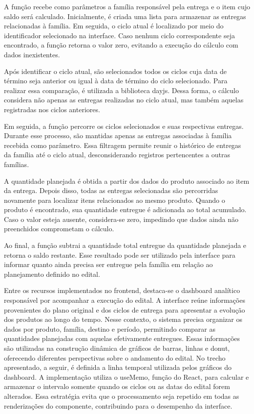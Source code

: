 A função recebe como parâmetros a família responsável pela entrega e o item cujo saldo será calculado. Inicialmente, é criada uma lista para armazenar as entregas relacionadas à família. Em seguida, o ciclo atual é localizado por meio do identificador selecionado na interface. Caso nenhum ciclo correspondente seja encontrado, a função retorna o valor zero, evitando a execução do cálculo com dados inexistentes.

Após identificar o ciclo atual, são selecionados todos os ciclos cuja data de término seja anterior ou igual à data de término do ciclo selecionado. Para realizar essa comparação, é utilizada a biblioteca dayjs. Dessa forma, o cálculo considera não apenas as entregas realizadas no ciclo atual, mas também aquelas registradas nos ciclos anteriores.

Em seguida, a função percorre os ciclos selecionados e suas respectivas entregas. Durante esse processo, são mantidas apenas as entregas associadas à família recebida como parâmetro. Essa filtragem permite reunir o histórico de entregas da família até o ciclo atual, desconsiderando registros pertencentes a outras famílias.

A quantidade planejada é obtida a partir dos dados do produto associado ao item da entrega. Depois disso, todas as entregas selecionadas são percorridas novamente para localizar itens relacionados ao mesmo produto. Quando o produto é encontrado, sua quantidade entregue é adicionada ao total acumulado. Caso o valor esteja ausente, considera-se zero, impedindo que dados ainda não preenchidos comprometam o cálculo.

Ao final, a função subtrai a quantidade total entregue da quantidade planejada e retorna o saldo restante. Esse resultado pode ser utilizado pela interface para informar quanto ainda precisa ser entregue pela família em relação ao planejamento definido no edital.

Entre os recursos implementados no frontend, destaca-se o dashboard analítico responsável por acompanhar a execução do edital. A interface reúne informações provenientes do plano original e dos ciclos de entrega para apresentar a evolução dos produtos ao longo do tempo. Nesse contexto, o sistema precisa organizar os dados por produto, família, destino e período, permitindo comparar as quantidades planejadas com aquelas efetivamente entregues. Essas informações são utilizadas na construção dinâmica de gráficos de barras, linhas e donut, oferecendo diferentes perspectivas sobre o andamento do edital. No trecho apresentado, a seguir, é definida a linha temporal utilizada pelos gráficos do dashboard. A implementação utiliza o useMemo, função do React,  para calcular e armazenar o intervalo somente quando os ciclos ou as datas do edital forem alterados. Essa estratégia evita que o processamento seja repetido em todas as renderizações do componente, contribuindo para o desempenho da interface. 

